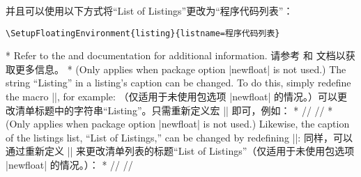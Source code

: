 \begin{paracol}{2}
\switchcolumn
并且可以使用以下方式将“List of Listings”更改为“程序代码列表”：
\begin{verbatim}
\SetupFloatingEnvironment{listing}{listname=程序代码列表}
\end{verbatim}
\switchcolumn[0]*%
Refer to the  and  documentation for additional information.
\switchcolumn
请参考  和  文档以获取更多信息。
\switchcolumn[0]*%
\DescribeMacro{\listingscaption}
(Only applies when package option |newfloat| is not used.) The string ``Listing'' in a listing's caption can be changed.
To do this, simply redefine the macro |\listingscaption|, for example:
\switchcolumn
\DescribeMacro{\listingscaption}
（仅适用于未使用包选项 |newfloat| 的情况。）可以更改清单标题中的字符串“Listing”。只需重新定义宏 |\listingscaption| 即可，例如：
\switchcolumn[0]*%
/\renewcommand{\listingscaption}{Program code}/
\switchcolumn
{}/\renewcommand{\listingscaption}{程序代码}/
\switchcolumn[0]*%
\DescribeMacro{\listoflistingscaption}
(Only applies when package option |newfloat| is not used.) Likewise, the caption of the listings list, ``List of Listings,'' can be changed by redefining
|\listoflistingscaption|:
\switchcolumn
\DescribeMacro{\listoflistingscaption}
同样，可以通过重新定义 |\listoflistingscaption| 来更改清单列表的标题“List of Listings”（仅适用于未使用包选项 |newfloat| 的情况。）：
\switchcolumn[0]*%
/\renewcommand{\listoflistingscaption}{List of Program Code}/
\switchcolumn
{}/\renewcommand{\listoflistingscaption}{程序代码列表}/
\end{paracol}